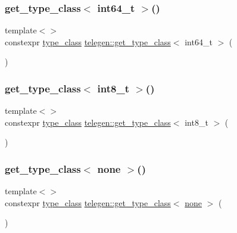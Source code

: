 \mbox{\label{namespacetelegen_aa2d79b86d034fbe0fb62169f96652ec6}} 
\subsubsection{\texorpdfstring{get\+\_\+type\+\_\+class$<$ int64\+\_\+t $>$()}{get\_type\_class< int64\_t >()}}
{\footnotesize\ttfamily template$<$$>$ \\
constexpr \hyperlink{namespacetelegen_a72d4e69f0be1731e1a851a96dec858d8}{type\+\_\+class} \hyperlink{namespacetelegen_a6ea75c665a463a240f4a40419a810da3}{telegen\+::get\+\_\+type\+\_\+class}$<$ int64\+\_\+t $>$ (\begin{DoxyParamCaption}{ }\end{DoxyParamCaption})}

\mbox{\label{namespacetelegen_a108eb8aee13c82f636d4a2d134851bca}} 
\subsubsection{\texorpdfstring{get\+\_\+type\+\_\+class$<$ int8\+\_\+t $>$()}{get\_type\_class< int8\_t >()}}
{\footnotesize\ttfamily template$<$$>$ \\
constexpr \hyperlink{namespacetelegen_a72d4e69f0be1731e1a851a96dec858d8}{type\+\_\+class} \hyperlink{namespacetelegen_a6ea75c665a463a240f4a40419a810da3}{telegen\+::get\+\_\+type\+\_\+class}$<$ int8\+\_\+t $>$ (\begin{DoxyParamCaption}{ }\end{DoxyParamCaption})}

\mbox{\label{namespacetelegen_a19a101eacce3582135d74ce02117b4d6}} 
\subsubsection{\texorpdfstring{get\+\_\+type\+\_\+class$<$ none $>$()}{get\_type\_class< none >()}}
{\footnotesize\ttfamily template$<$$>$ \\
constexpr \hyperlink{namespacetelegen_a72d4e69f0be1731e1a851a96dec858d8}{type\+\_\+class} \hyperlink{namespacetelegen_a6ea75c665a463a240f4a40419a810da3}{telegen\+::get\+\_\+type\+\_\+class}$<$ \hyperlink{structnone}{none} $>$ (\begin{DoxyParamCaption}{ }\end{DoxyParamCaption})}

